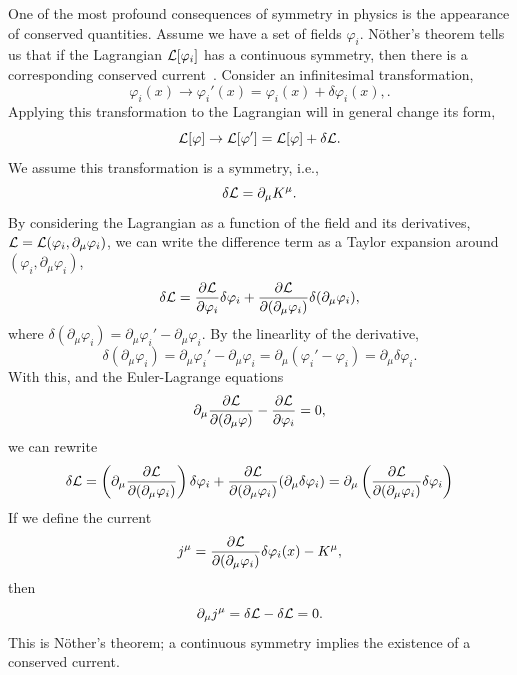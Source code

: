 One of the most profound consequences of symmetry in physics is the appearance of conserved quantities.
Assume we have a set of fields $\varphi_i$. Nöther's theorem tells us that if the Lagrangian $\mathcal{L}[\varphi_i]$ has a continuous symmetry, then there is a corresponding conserved current~\autocite{carrollSpacetimeGeometryIntroduction2019,peskinIntroductionQuantumField1995}.
Consider an infinitesimal transformation,
\begin{equation}
    \varphi_i(x) \longrightarrow \varphi_i'(x)
    = \varphi_i(x) + \delta \varphi_i(x),.
\end{equation}
%
Applying this transformation to the Lagrangian will in general change its form,
\begin{equation}
    \mathcal{L}[\varphi] \rightarrow \mathcal{L}[\varphi']
    = \mathcal{L}[\varphi] + \delta \mathcal{L}.
\end{equation}
%
We assume this transformation is a symmetry, i.e.,
\begin{equation*}
    \delta \mathcal{L} = \partial_\mu K^\mu.
\end{equation*}
%
By considering the Lagrangian as a function of the field and its derivatives, $\mathcal{L} = \mathcal{L}(\varphi_i, \partial_\mu \varphi_i)$, we can write the difference term as a Taylor expansion around $(\varphi_i, \partial_\mu \varphi_i)$,
\begin{align}
    \delta \mathcal{L}
    = \pdv{\mathcal{L}}{\varphi_i} \delta \varphi_i
    + \pdv{\mathcal{L}}{(\partial_\mu \varphi_i)} \delta (\partial_\mu \varphi_i),
\end{align}
%
where $\delta (\partial_\mu \varphi_i) = \partial_\mu \varphi_i' - \partial_\mu \varphi_i$.
By the linearlity of the derivative,
\begin{equation}
    \delta (\partial_\mu \varphi_i)
    = \partial_\mu \varphi_i' - \partial_\mu \varphi_i
    = \partial_\mu (\varphi_i' - \varphi_i)
    = \partial_\mu \delta \varphi_i.
\end{equation}
%
With this, and the Euler-Lagrange equations
\begin{equation}
    \partial_\mu \pdv{\mathcal{L}}{(\partial_\mu \varphi)} - \pdv{\mathcal{L}}{\varphi_i} = 0,
\end{equation}
%
we can rewrite
\begin{equation}
    \delta \mathcal{L} = \left( \partial_\mu \pdv{\mathcal{L}}{(\partial_\mu \varphi_i)} \right) \delta \varphi_i
    + \pdv{\mathcal{L}}{(\partial_\mu \varphi_i)} (\partial_\mu \delta \varphi_i)
    = \partial_\mu \left(\pdv{\mathcal{L}}{(\partial_\mu \varphi_i)} \delta \varphi_i\right)
\end{equation}
%
If we define the current
\begin{equation}
    j^\mu = \pdv{\mathcal{L}}{(\partial_\mu \varphi_i)} \delta \varphi_i(x) - K^\mu,
\end{equation}
%
then 
\begin{equation}
    \partial_\mu j^\mu = \delta \mathcal{L} - \delta \mathcal{L} = 0.
\end{equation}
%
This is Nöther's theorem; a continuous symmetry implies the existence of a conserved current.

